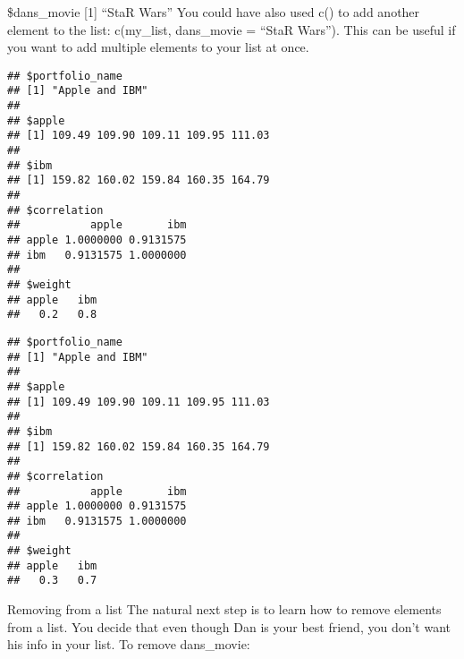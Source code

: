 \documentclass[]{article}
\newenvironment{Shaded}{\begin{snugshade}}{\end{snugshade}}
\newcommand{\KeywordTok}[1]{\textcolor[rgb]{0.13,0.29,0.53}{\textbf{#1}}}
\newcommand{\DataTypeTok}[1]{\textcolor[rgb]{0.13,0.29,0.53}{#1}}
\newcommand{\FloatTok}[1]{\textcolor[rgb]{0.00,0.00,0.81}{#1}}
\newcommand{\StringTok}[1]{\textcolor[rgb]{0.31,0.60,0.02}{#1}}
\newcommand{\CommentTok}[1]{\textcolor[rgb]{0.56,0.35,0.01}{\textit{#1}}}
\newcommand{\OperatorTok}[1]{\textcolor[rgb]{0.81,0.36,0.00}{\textbf{#1}}}
\newcommand{\NormalTok}[1]{#1}
\begin{document}
\$dans\_movie {[}1{]} ``StaR Wars'' You could have also used c() to add
another element to the list: c(my\_list, dans\_movie = ``StaR Wars'').
This can be useful if you want to add multiple elements to your list at
once.

\begin{Shaded}
\end{Shaded}

\begin{verbatim}
## $portfolio_name
## [1] "Apple and IBM"
## 
## $apple
## [1] 109.49 109.90 109.11 109.95 111.03
## 
## $ibm
## [1] 159.82 160.02 159.84 160.35 164.79
## 
## $correlation
##           apple       ibm
## apple 1.0000000 0.9131575
## ibm   0.9131575 1.0000000
## 
## $weight
## apple   ibm 
##   0.2   0.8
\end{verbatim}

\begin{Shaded}
\end{Shaded}

\begin{verbatim}
## $portfolio_name
## [1] "Apple and IBM"
## 
## $apple
## [1] 109.49 109.90 109.11 109.95 111.03
## 
## $ibm
## [1] 159.82 160.02 159.84 160.35 164.79
## 
## $correlation
##           apple       ibm
## apple 1.0000000 0.9131575
## ibm   0.9131575 1.0000000
## 
## $weight
## apple   ibm 
##   0.3   0.7
\end{verbatim}

Removing from a list The natural next step is to learn how to remove
elements from a list. You decide that even though Dan is your best
friend, you don't want his info in your list. To remove dans\_movie:
\end{document}
